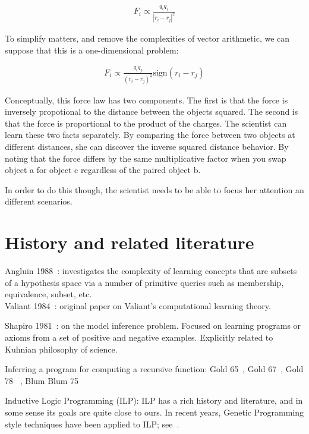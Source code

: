 \documentclass{article}
\begin{document}
\begin{align}
  F_i \propto \frac{q_i q_j}{|r_i - r_j|^2}
\end{align}

To simplify matters, and remove the complexities of vector arithmetic, we can
suppose that this is a one-dimensional problem: 

\begin{align}
  F_i \propto \frac{q_i q_j}{(r_i - r_j)^2} \text{sign}(r_i - r_j)
\end{align}

Conceptually, this force law has two components. The first is that the force is
inversely propotional to the distance between the objects squared. The second
is that the force is proportional to the product of the charges. The scientist
can learn these two facts separately. By comparing the force between two
objects at different distances, she can discover the inverse squared distance
behavior. By noting that the force differs by the same multiplicative factor
when you swap object a for object c regardless of the paired object b. 

In order to do this though, the scientist needs to be able to focus her
attention an different scenarios. 

\section{History and related literature}
Angluin 1988~\cite{angluin1988queries}: investigates the complexity of
learning concepts that are subsets of a hypothesis space via a number
of primitive queries such as membership, equivalence, subset, etc. \\

Valiant 1984~\cite{valiant1984theory}: original paper on Valiant's
computational learning theory.

Shapiro 1981~\cite{shapiro1981algorithm}: on the model inference
problem. Focused on learning programs or axioms from a set of positive
and negative examples. Explicitly related to Kuhnian philosophy of
science.

Inferring a program for computing a recursive function: 
Gold 65~\cite{gold1965limiting}, 
Gold 67~\cite{gold1967language},
Gold 78 ~\cite{gold1978complexity},
Blum  Blum 75~\cite{blum1975toward}

Inductive Logic Programming (ILP): ILP has a rich history and
literature, and in some sense its goals are quite close to ours. In
recent years, Genetic Programming style techniques have been applied
to ILP; see~\cite{divina2006evolutionary}.
\end{document}
